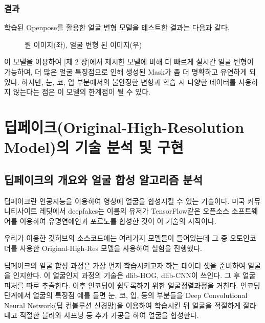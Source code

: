 \documentclass{oblivoir}
\begin{document}
\subsection{ 결과 }

학습된 Openpose를 활용한 얼굴 변형 모델을 테스트한 결과는 다음과 같다.
\begin{figure}[h!]
  \centering
  \caption{원 이미지(좌), 얼굴 변형 된 이미지(우)}
\end{figure}


이 모델을 이용하여 [제 2 장]에서 제시한 모델에 비해 더 빠르게 실시간 얼굴 변형이 가능하며, 더 많은 얼굴 특징점으로 인해 생성된 Mask가 좀 더 명확하고 유연하게 되었다. 하지만, 눈, 코, 입 부분에서의 불안정한 변형과 학습 시 다양한 데이터를 사용하지 않는다는 점은 이 모델의 한계점이 될 수 있다.

\chapter{딥페이크(Original-High-Resolution Model)의 기술 분석 및 구현}

\section{ 딥페이크의 개요와 얼굴 합성 알고리즘 분석}

딥페이크란 인공지능을 이용하여 영상에 얼굴을 합성시킬 수 있는 기술이다. 미국 커뮤니티사이트 레딧에서 deepfakes는 이름의 유저가 TensorFlow같은 오픈소스 소프트웨어를 이용하여 유명연예인과 포르노를 합성한 것이 이 기술의 시작이다.

우리가 이용한 \cite{reference11} 깃허브의 소스코드에는 여러가지 모델들이 들어있는데 그 중 오토인코더를 사용한 Original-High-Res 모델을 사용하여 실험을 진행했다.

딥페이크의 얼굴 합성 과정은 가장 먼저 학습시키고자 하는 데이터 셋을 준비하여 얼굴을 인지한다. 이 얼굴인지 과정의 기술은 dlib-HOG, dlib-CNN이 쓰인다. 그 후 얼굴 피처를 따로 추출한다. 이후 인코딩이 쉽도록하기 위한 얼굴정렬과정을 거친다. 인코딩 단계에서 얼굴의 특징점 예를 들면 눈, 코, 입, 등의 부분들을 Deep Convolutional Neural Network(딥 컨볼루션 신경망)을 이용하여 학습시킨 뒤 얼굴을 적절하게 잘라내고 적절한 블러와 샤프닝 등 추가 가공을 하여 얼굴을 합성한다.
\end{document}
